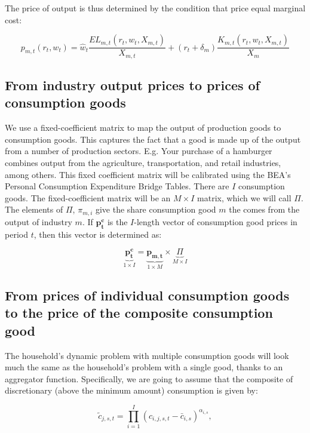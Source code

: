 \documentclass[letterpaper,12pt]{article}
\theoremstyle{definition}
\begin{document}
The price of output is thus determined by the condition that price equal marginal cost:

\begin{equation}
\label{eqn:output_price}
p_{m,t}(r_{t},w_{t}) = \hat{w}_{t}\frac{EL_{m,t}(r_{t},w_{t},X_{m,t})}{X_{m,t}} + (r_{t}+\delta_{m})\frac{K_{m,t}(r_{t},w_{t},X_{m,t})}{X_{m}}
\end{equation}

\subsection*{From industry output prices to prices of consumption goods}

We use a fixed-coefficient matrix to map the output of production goods to consumption goods.  This captures the fact that a good is made up of the output from a number of production sectors.  E.g. Your purchase of a hamburger combines output from the agriculture, transportation, and retail industries, among others.  This fixed coefficient matrix will be calibrated using the BEA's Personal Consumption Expenditure Bridge Tables.  There are $I$ consumption goods.  The fixed-coefficient matrix will be an $M\times I$ matrix, which we will call $\Pi$.  The elements of $\Pi$, $\pi_{m,i}$ give the share consumption good $m$ the comes from the output of industry $m$.  If $\boldsymbol{p^{c}_{t}}$ is the $I$-length vector of consumption good prices in period $t$, then this vector is determined as:

\begin{equation}
\label{eqn:cons_price}
\underbrace{\boldsymbol{p^{c}_{t}}}_{1 \times I} = \underbrace{\boldsymbol{p_{m,t}}}_{1 \times M} \times \underbrace{\Pi}_{M \times I}
\end{equation}

\subsection*{From prices of individual consumption goods to the price of the composite consumption good}

The household's dynamic problem with multiple consumption goods will look much the same as the household's problem with a single good, thanks to an aggregator function.  Specifically, we are going to assume that the composite of discretionary (above the minimum amount) consumption is given by:

\begin{equation} \label{eqn:comp_cons}
\tilde{c}_{j,s,t}  = \prod_{i=1}^I \left( c_{i,j,s,t} - \bar{c}_{i,s} \right) ^{\alpha_{i,s}}, 
 \end{equation}
 
\end{document}
